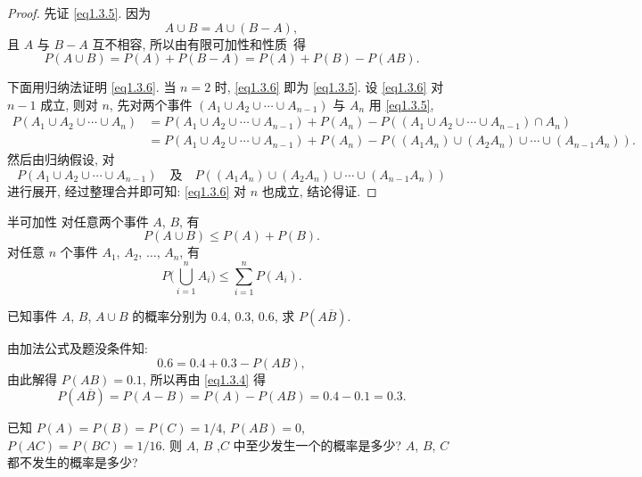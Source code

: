 \begin{proof}
  先证 \eqref{eq1.3.5}. 因为
  \[
    A \cup B = A \cup (B - A),
  \]
  且 $A$ 与 $B - A$ 互不相容,
  所以由有限可加性和性质~\label{property1.3.5}得
  \[
    P (A \cup B) = P (A) + P (B - A) = P (A) + P (B) - P(AB).
  \]

  下面用归纳法证明 \eqref{eq1.3.6}.
  当 $n=2$ 时,
  \eqref{eq1.3.6} 即为 \eqref{eq1.3.5}.
  设 \eqref{eq1.3.6} 对 $n - 1$ 成立,
  则对 $n$,
  先对两个事件 $(A_1 \cup A_2 \cup \dotsb \cup A_{n-1})$ 与 $A_n$ 用 \eqref{eq1.3.5},
  \begin{align*}
    P (A_1 \cup A_2 \cup \dotsb \cup A_n)
    &= P (A_1 \cup A_2 \cup \dotsb \cup A_{n-1}) + P (A_n)
    - P ( (A_1 \cup A_2 \cup \dotsb \cup A_{n-1}) \cap A_n )\\
    &= P (A_1 \cup A_2 \cup \dotsb \cup A_{n-1}) + P (A_n)
    - P ( (A_1 A_n) \cup (A_2 A_n) \cup \dotsb \cup (A_{n-1} A_n) ).
  \end{align*}
  然后由归纳假设,
  对
  \[
    P (A_1 \cup A_2 \cup \dotsb \cup A_{n-1})
    \quad \text{及} \quad
    P ( (A_1 A_n) \cup (A_2 A_n) \cup \dotsb \cup (A_{n-1} A_n) )
  \]
  进行展开,
  经过整理合并即可知:
  \eqref{eq1.3.6} 对 $n$ 也成立,
  结论得证.
\end{proof}

\begin{corollary}{半可加性}
  对任意两个事件 $A$, $B$,
  有
  \begin{equation}
    P (A \cup B) \le P (A) + P (B).
    \label{eq1.3.7}
  \end{equation}
  对任意 $n$ 个事件 $A_1$, $A_2$, $\dotsc$, $A_n$,
  有
  \begin{equation}
    P \biggl( \bigcup _{i=1} ^n A_i \biggr) \le \sum _{i=1} ^n P (A_i).
    \label{eq1.3.8}
  \end{equation}
\end{corollary}

\begin{example}
  已知事件 $A$, $B$, $A \cup B$ 的概率分别为 0.4, 0.3, 0.6,
  求 $P (A \overline{B})$.
\end{example}

\begin{solution}
  由加法公式及题没条件知:
  \[
    0.6 = 0.4 + 0.3 - P (AB),
  \]
  由此解得 $P (AB) = 0.1$,
  所以再由 \eqref{eq1.3.4} 得
  \[
    P (A \overline{B}) = P (A - B) = P (A) - P (AB) = 0.4 - 0.1 = 0.3.
  \]
\end{solution}

\begin{example}
  已知 $P (A) = P (B) = P (C) = 1/4$,
  $P (AB) = 0$,
  $P (AC) = P (BC) = 1/16$.
  则 $A$, $B$ ,$C$ 中至少发生一个的概率是多少?
  $A$, $B$, $C$ 都不发生的概率是多少?
\end{example}

